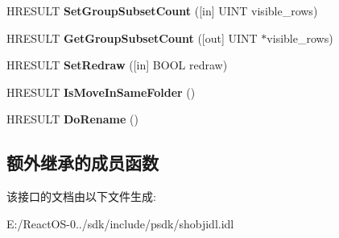 \begin{DoxyCompactItemize}
\item 
\mbox{\label{interface_i_folder_view2_ab1dc4215c218c3eb52cfd5994d4829e9}} 
H\+R\+E\+S\+U\+LT {\bfseries Set\+Group\+Subset\+Count} (\mbox{[}in\mbox{]} U\+I\+NT visible\+\_\+rows)
\item 
\mbox{\label{interface_i_folder_view2_a2ad135eb4806737c3b36ba7bc5e12ee5}} 
H\+R\+E\+S\+U\+LT {\bfseries Get\+Group\+Subset\+Count} (\mbox{[}out\mbox{]} U\+I\+NT $\ast$visible\+\_\+rows)
\item 
\mbox{\label{interface_i_folder_view2_a8e987ee7fa105a033a68b10a07a11b07}} 
H\+R\+E\+S\+U\+LT {\bfseries Set\+Redraw} (\mbox{[}in\mbox{]} B\+O\+OL redraw)
\item 
\mbox{\label{interface_i_folder_view2_a95a2360ae90b6c0f0ca6b7d60e1962a4}} 
H\+R\+E\+S\+U\+LT {\bfseries Is\+Move\+In\+Same\+Folder} ()
\item 
\mbox{\label{interface_i_folder_view2_a5e6231a425cbd634b8dc40a756853e85}} 
H\+R\+E\+S\+U\+LT {\bfseries Do\+Rename} ()
\end{DoxyCompactItemize}
\subsection*{额外继承的成员函数}


该接口的文档由以下文件生成\+:\begin{DoxyCompactItemize}
\item 
E\+:/\+React\+O\+S-\/0../sdk/include/psdk/shobjidl.\+idl\end{DoxyCompactItemize}
